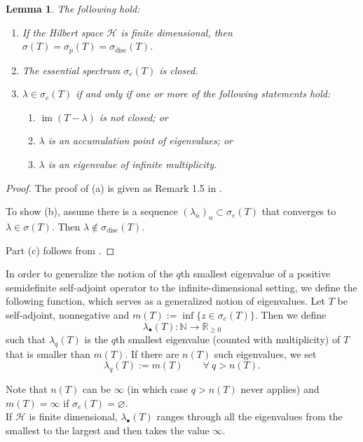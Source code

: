 \documentclass[11pt]{article}
\newtheorem{lemma}[theorem]{Lemma}
\theoremstyle{definition}
\theoremstyle{remark}
\DeclareMathOperator{\im}{im}
\newcommand{\Hh}{\mathcal{H}}
\newcommand{\R}{\mathbb{R}}
\newcommand{\N}{\mathbb{N}}
\begin{document}
\begin{lemma} \label{rem:spectrum} The following hold:
    \begin{enumerate}
        \item[(a)] If the Hilbert space $\Hh$ is finite dimensional, then $\sigma(T)=\sigma_p(T)=\sigma_{\text{disc}}(T)$.
        \item[(b)] The essential spectrum $\sigma_e(T)$ is closed.
        \item[(c)] $\lambda \in \sigma_e(T)$ if and only if one or more of the following statements hold: 
        \begin{enumerate}
        \item[(i)] $\im(T - \lambda)$ is not closed; or 
        \item[(ii)] $\lambda$ is an accumulation point of eigenvalues; or 
        \item[(iii)] $\lambda$ is an eigenvalue of infinite multiplicity.
        \end{enumerate}
    \end{enumerate}
\end{lemma}
\begin{proof}
    The proof of (a) is given as Remark 1.5 in \citet{spectraltheory}.
    
    To show (b), assume there is a sequence $(\lambda_n)_n \subset \sigma_e(T)$ that converges to $\lambda \in \sigma(T)$. Then $\lambda \not\in \sigma_\text{disc}(T)$.
    
    Part (c) follows from \citet[p.~26]{schroedingerop}.
\end{proof}

In order to generalize the notion of the $q$th smallest eigenvalue of a positive semidefinite self-adjoint operator to the infinite-dimensional setting, we define the following function, which serves as a generalized notion of eigenvalues. Let $T$ be self-adjoint, nonnegative and $m(T):= \inf\{ z \in \sigma_e(T) \}$.
    Then we define 
    \begin{equation}
    \label{eq:specctng}
    \lambda_{\bullet}(T): \N \rightarrow \R_{\ge 0}
    \end{equation}
    such that $\lambda_q(T)$ is the $q$th smallest eigenvalue (counted with multiplicity) of $T$ that is smaller than $m(T)$. If there are $n(T)$ such eigenvalues, we set
    $$
    \lambda_q(T):= m(T) \qquad \forall\ q > n(T).
    $$ 


Note that $n(T)$ can be $\infty$ (in which case $q>n(T)$ never applies) and $m(T)= \infty$ if $\sigma_e(T)=\varnothing$.\\
If $\Hh$ is finite dimensional, $\lambda_\bullet (T)$ ranges through all the eigenvalues from the smallest to the largest and then takes the value $\infty$.
\end{document}
